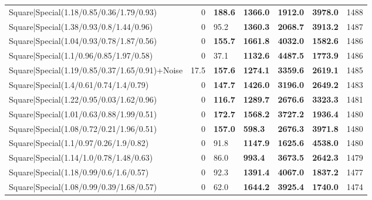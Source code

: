 \begin{tabular}{lrllllr}
 Square|Special(1.18/0.85/0.36/1.79/0.93)                      &             0   & \textbf{188.6} & \textbf{1366.0} & \textbf{1912.0} & \textbf{3978.0} &         1488 \\
 Square|Special(1.38/0.93/0.8/1.44/0.96)                       &             0   & 95.2           & \textbf{1360.3} & \textbf{2068.7} & \textbf{3913.2} &         1487 \\
 Square|Special(1.04/0.93/0.78/1.87/0.56)                      &             0   & \textbf{155.7} & \textbf{1661.8} & \textbf{4032.0} & \textbf{1582.6} &         1486 \\
 Square|Special(1.1/0.96/0.85/1.97/0.58)                       &             0   & 37.1           & \textbf{1132.6} & \textbf{4487.5} & \textbf{1773.9} &         1486 \\
 Square|Special(1.19/0.85/0.37/1.65/0.91)+Noise                &            17.5 & \textbf{157.6} & \textbf{1274.1} & \textbf{3359.6} & \textbf{2619.1} &         1485 \\
 Square|Special(1.4/0.61/0.74/1.4/0.79)                        &             0   & \textbf{147.7} & \textbf{1426.0} & \textbf{3196.0} & \textbf{2649.2} &         1483 \\
 Square|Special(1.22/0.95/0.03/1.62/0.96)                      &             0   & \textbf{116.7} & \textbf{1289.7} & \textbf{2676.6} & \textbf{3323.3} &         1481 \\
 Square|Special(1.01/0.63/0.88/1.99/0.51)                      &             0   & \textbf{172.7} & \textbf{1568.2} & \textbf{3727.2} & \textbf{1936.4} &         1480 \\
 Square|Special(1.08/0.72/0.21/1.96/0.51)                      &             0   & \textbf{157.0} & \textbf{598.3}  & \textbf{2676.3} & \textbf{3971.8} &         1480 \\
 Square|Special(1.1/0.97/0.26/1.9/0.82)                        &             0   & 91.8           & \textbf{1147.9} & \textbf{1625.6} & \textbf{4538.0} &         1480 \\
 Square|Special(1.14/1.0/0.78/1.48/0.63)                       &             0   & 86.0           & \textbf{993.4}  & \textbf{3673.5} & \textbf{2642.3} &         1479 \\
 Square|Special(1.18/0.99/0.6/1.6/0.57)                        &             0   & 92.3           & \textbf{1391.4} & \textbf{4067.0} & \textbf{1837.2} &         1477 \\
 Square|Special(1.08/0.99/0.39/1.68/0.57)                      &             0   & 62.0           & \textbf{1644.2} & \textbf{3925.4} & \textbf{1740.0} &         1474 \\

\end{tabular}
